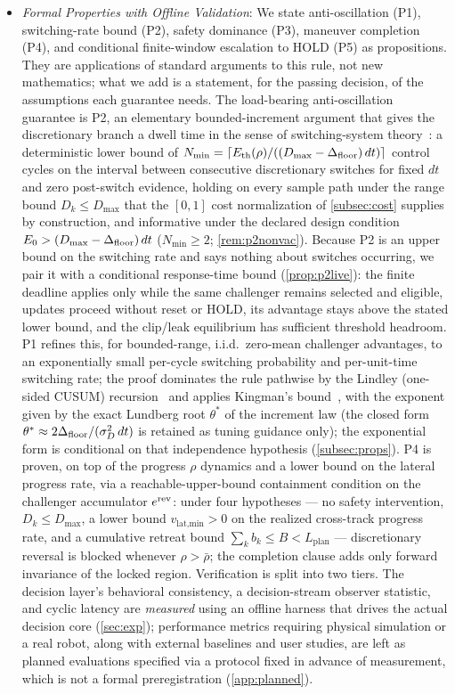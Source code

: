 \begin{itemize}
\item \emph{Formal Properties with Offline Validation}: We state anti-oscillation (P1), switching-rate bound (P2), safety dominance (P3), maneuver completion (P4), and conditional finite-window escalation to HOLD (P5) as propositions. They are applications of standard arguments to this rule, not new mathematics; what we add is a statement, for the passing decision, of the assumptions each guarantee needs. The load-bearing anti-oscillation guarantee is P2, an elementary bounded-increment argument that gives the discretionary branch a dwell time in the sense of switching-system theory~\citep{hespanha1999dwell}: a deterministic lower bound of $N_{\min} = \lceil E_{\text{th}}(\rho)/((D_{\max}-\Delta_{\text{floor}})\,dt)\rceil$ control cycles on the interval between consecutive discretionary switches for fixed $dt$ and zero post-switch evidence, holding on every sample path under the range bound $D_k \le D_{\max}$ that the $[0,1]$ cost normalization of \cref{subsec:cost} supplies by construction, and informative under the declared design condition $E_0 > (D_{\max}-\Delta_{\text{floor}})\,dt$ ($N_{\min} \ge 2$; \cref{rem:p2nonvac}). Because P2 is an upper bound on the switching rate and says nothing about switches occurring, we pair it with a conditional response-time bound (\cref{prop:p2live}): the finite deadline applies only while the same challenger remains selected and eligible, updates proceed without reset or HOLD, its advantage stays above the stated lower bound, and the clip/leak equilibrium has sufficient threshold headroom. P1 refines this, for bounded-range, i.i.d.\ zero-mean challenger advantages, to an exponentially small per-cycle switching probability and per-unit-time switching rate; the proof dominates the rule pathwise by the Lindley (one-sided CUSUM) recursion~\citep{lindley1952queue,page1954cusum} and applies Kingman's bound~\citep{kingman1970queues}, with the exponent given by the exact Lundberg root $\theta^*$ of the increment law (the closed form $\theta^* \approx 2\Delta_{\text{floor}}/(\sigma_D^2\,dt)$ is retained as tuning guidance only); the exponential form is conditional on that independence hypothesis (\cref{subsec:props}). P4 is proven, on top of the progress $\rho$ dynamics and a lower bound on the lateral progress rate, via a reachable-upper-bound containment condition on the challenger accumulator $e^{\text{rev}}$: under four hypotheses --- no safety intervention, $D_k\le D_{\max}$, a lower bound $v_{\text{lat,min}}>0$ on the realized cross-track progress rate, and a cumulative retreat bound $\sum_k b_k\le B<L_{\text{plan}}$ --- discretionary reversal is blocked whenever $\rho>\bar\rho$; the completion clause adds only forward invariance of the locked region. Verification is split into two tiers. The decision layer's behavioral consistency, a decision-stream observer statistic, and cyclic latency are \emph{measured} using an offline harness that drives the actual decision core (\cref{sec:exp}); performance metrics requiring physical simulation or a real robot, along with external baselines and user studies, are left as planned evaluations specified via a protocol fixed in advance of measurement, which is not a formal preregistration (\cref{app:planned}).
\end{itemize}

